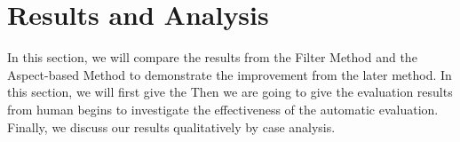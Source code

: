\section{Results and Analysis}
\label{sec:res}

In this section, we will compare the results from the Filter Method and the Aspect-based Method to demonstrate the improvement from the later method. 
In this section, we will first give the 
Then we are going to give the evaluation results from human begins to investigate the effectiveness of the  automatic evaluation.
Finally, we discuss our results qualitatively by case analysis.




